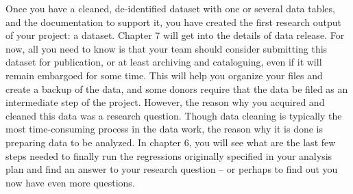 Once you have a cleaned, 
de-identified dataset with one or several data tables,
and the documentation to support it,
you have created the first research output of your project: a dataset.
Chapter 7 will get into the details of data release.
For now, all you need to know is that your team
should consider submitting this dataset for publication,
or at least archiving and cataloguing,
even if it will remain embargoed for some time.
This will help you organize your files and create a backup of the data,
and some donors require that the data be filed as an intermediate step of the project.
However, the reason why you acquired and cleaned this data
was a research question.
Though data cleaning is typically the most time-consuming process in the data work,
the reason why it is done is preparing data to be analyzed.
In chapter 6, you will see what are the last few steps needed to finally run the
regressions originally specified in your analysis plan
and find an answer to your research question --
or perhaps to find out you now have even more questions.

